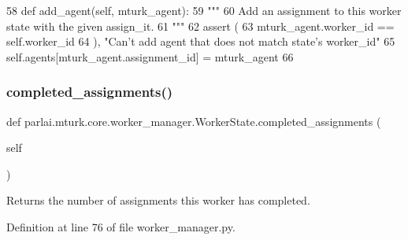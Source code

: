 \begin{DoxyCode}
58     \textcolor{keyword}{def }add\_agent(self, mturk\_agent):
59         \textcolor{stringliteral}{"""}
60 \textcolor{stringliteral}{        Add an assignment to this worker state with the given assign\_it.}
61 \textcolor{stringliteral}{        """}
62         \textcolor{keyword}{assert} (
63             mturk\_agent.worker\_id == self.worker\_id
64         ), \textcolor{stringliteral}{"Can't add agent that does not match state's worker\_id"}
65         self.agents[mturk\_agent.assignment\_id] = mturk\_agent
66 
\end{DoxyCode}
\mbox{\label{classparlai_1_1mturk_1_1core_1_1worker__manager_1_1WorkerState_ae38b2ad12b9cf5282bb025d3b60e7e61}} 
\subsubsection{\texorpdfstring{completed\+\_\+assignments()}{completed\_assignments()}}
{\footnotesize\ttfamily def parlai.\+mturk.\+core.\+worker\+\_\+manager.\+Worker\+State.\+completed\+\_\+assignments (\begin{DoxyParamCaption}\item[{}]{self }\end{DoxyParamCaption})}

\begin{DoxyVerb}Returns the number of assignments this worker has completed.
\end{DoxyVerb}
 

Definition at line 76 of file worker\+\_\+manager.\+py.


